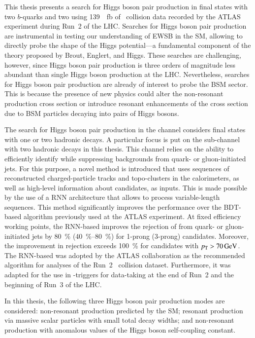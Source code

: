 This thesis presents a search for Higgs boson pair production in final states
with two $b$-quarks and two \tauleptons using \SI{139}{\per\femto\barn} of
\pp~collision data recorded by the ATLAS experiment during Run~2 of the
LHC. Searches for Higgs boson pair production are instrumental in testing our
understanding of EWSB in the SM, allowing to directly probe the shape of the
Higgs potential---a fundamental component of the theory proposed by Brout,
Englert, and Higgs. These searches are challenging, however, since Higgs boson
pair production is three orders of magnitude less abundant than single Higgs
boson production at the LHC. Nevertheless, searches for Higgs boson pair
production are already of interest to probe the BSM sector. This is because the
presence of new physics could alter the non-resonant \HH production cross
section or introduce resonant enhancements of the cross section due to BSM
particles decaying into pairs of Higgs bosons.


The search for Higgs boson pair production in the \bbtautau channel considers
final states with one or two hadronic \taulepton decays. A particular focus is
put on the sub-channel with two hadronic \taulepton decays in this thesis. This
channel relies on the ability to efficiently identify \tauhadvis while
suppressing backgrounds from quark- or gluon-initiated jets. For this purpose, a
novel \tauid method is introduced that uses sequences of reconstructed
charged-particle tracks and topo-clusters in the calorimeters, as well as
high-level information about \tauhadvis candidates, as inputs. This is made
possible by the use of a RNN architecture that allows to process variable-length
sequences. This method significantly improves the \tauid performance over the
BDT-based algorithm previously used at the ATLAS experiment. At fixed \tauhadvis
efficiency working points, the RNN-based \tauid improves the rejection of
\faketauhadvis from quark- or gluon-initiated jets by \SI{80}{\percent}
(\SIrange{40}{80}{\percent}) for 1-prong (3-prong) \tauhadvis
candidates. Moreover, the improvement in \faketauhadvis rejection exceeds
\SI{100}{\percent} for candidates with $\pT > \SI{70}{\GeV}$. The RNN-based
\tauid was adopted by the ATLAS collaboration as the recommended \tauid
algorithm for analyses of the Run~2 \pp~collision dataset. Furthermore, it was
adapted for the use in \tauhadvis-triggers for data-taking at the end of Run~2
and the beginning of Run~3 of the LHC.


In this thesis, the following three Higgs boson pair production modes are
considered: non-resonant \HH production predicted by the SM; resonant \HH
production via massive scalar particles with small total decay widths; and
non-resonant \HH production with anomalous values of the Higgs boson
self-coupling constant.


